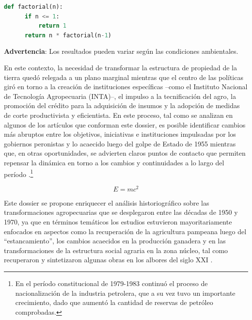 \documentclass{article}
\begin{document}
\begin{lstlisting}[language=Python]
def factorial(n):
      if n <= 1:
          return 1
      return n * factorial(n-1)
\end{lstlisting}


\begin{tcolorbox}[colback=brown!8!white,colframe=brown!8!white,boxrule=0pt,arc=2pt,left=4pt,right=4pt,top=3pt,bottom=3pt,before skip=4pt,after skip=4pt]
{\sffamily\small
\textbf{Advertencia}: Los resultados pueden variar según las
  condiciones ambientales.

}
\end{tcolorbox}

En este contexto, la necesidad de transformar la estructura de propiedad de la tierra quedó relegada a un plano marginal mientras que el centro de las políticas giró en torno a la creación de instituciones específicas –como el Instituto Nacional de Tecnología Agropecuaria (INTA)–, el impulso a la tecnificación del agro, la promoción del crédito para la adquisición de insumos y la adopción de medidas de corte productivista y eficientista. En este proceso, tal como se analizan en algunos de los artículos que conforman este dossier, es posible identificar cambios más abruptos entre los objetivos, iniciativas e instituciones impulsadas por los gobiernos peronistas y lo acaecido luego del golpe de Estado de 1955 mientras que, en otras oportunidades, se advierten claros puntos de contacto que permiten repensar la dinámica en torno a los cambios y continuidades a lo largo del período \autocite{2822-AMIGOTLEACHE2009}.\footnote{En el período constitucional de 1979-1983 continuó el proceso de
  nacionalización de la industria petrolera, que a su vez tuvo un
  importante crecimiento, dado que aumentó la cantidad de reservas de
  petróleo comprobadas.}


\begin{equation}\label{eq-id}
E = mc^2
\end{equation}

Este dossier se propone enriquecer el análisis historiográfico sobre las transformaciones agropecuarias que se desplegaron entre las décadas de 1950 y 1970, ya que en términos temáticos los estudios estuvieron mayoritariamente enfocados en aspectos como la recuperación de la agricultura pampeana luego del “estancamiento”, los cambios acaecidos en la producción ganadera y en las transformaciones de la estructura social agraria en la zona núcleo, tal como recuperaron y sintetizaron algunas obras en los albores del siglo XXI \autocite{2827-BARBA1998,2832-ZEBALLOSDEHEREDIA1930}.
\end{document}

